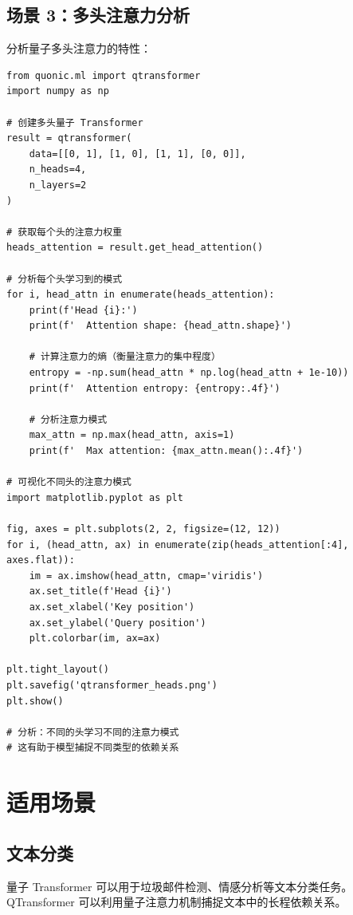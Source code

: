 \documentclass[12pt,a4paper]{article}
\begin{document}
\subsection{场景 3：多头注意力分析}

分析量子多头注意力的特性：

\begin{verbatim}
from quonic.ml import qtransformer
import numpy as np

# 创建多头量子 Transformer
result = qtransformer(
    data=[[0, 1], [1, 0], [1, 1], [0, 0]],
    n_heads=4,
    n_layers=2
)

# 获取每个头的注意力权重
heads_attention = result.get_head_attention()

# 分析每个头学习到的模式
for i, head_attn in enumerate(heads_attention):
    print(f'Head {i}:')
    print(f'  Attention shape: {head_attn.shape}')

    # 计算注意力的熵（衡量注意力的集中程度）
    entropy = -np.sum(head_attn * np.log(head_attn + 1e-10))
    print(f'  Attention entropy: {entropy:.4f}')

    # 分析注意力模式
    max_attn = np.max(head_attn, axis=1)
    print(f'  Max attention: {max_attn.mean():.4f}')

# 可视化不同头的注意力模式
import matplotlib.pyplot as plt

fig, axes = plt.subplots(2, 2, figsize=(12, 12))
for i, (head_attn, ax) in enumerate(zip(heads_attention[:4], axes.flat)):
    im = ax.imshow(head_attn, cmap='viridis')
    ax.set_title(f'Head {i}')
    ax.set_xlabel('Key position')
    ax.set_ylabel('Query position')
    plt.colorbar(im, ax=ax)

plt.tight_layout()
plt.savefig('qtransformer_heads.png')
plt.show()

# 分析：不同的头学习不同的注意力模式
# 这有助于模型捕捉不同类型的依赖关系
\end{verbatim}

\section{适用场景}

\subsection{文本分类}

量子 Transformer 可以用于垃圾邮件检测、情感分析等文本分类任务。QTransformer 可以利用量子注意力机制捕捉文本中的长程依赖关系。
\end{document}
